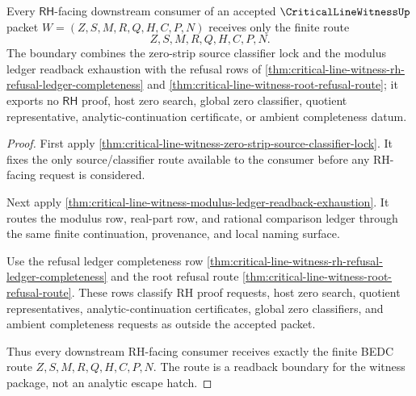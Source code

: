 \begin{theorem}
\label{thm:critical-line-witness-rh-boundary-consumer-nonescape}
Every $\mathsf{RH}$-facing downstream consumer of an accepted $\CriticalLineWitnessUp$ packet $W=(Z,S,M,R,Q,H,C,P,N)$ receives only the finite route
$$
Z,S,M,R,Q,H,C,P,N .
$$
The boundary combines the zero-strip source classifier lock and the modulus ledger readback exhaustion with the refusal rows of \autoref{thm:critical-line-witness-rh-refusal-ledger-completeness} and \autoref{thm:critical-line-witness-root-refusal-route}; it exports no $\mathsf{RH}$ proof, host zero search, global zero classifier, quotient representative, analytic-continuation certificate, or ambient completeness datum.
\end{theorem}
\begin{proof}
First apply \autoref{thm:critical-line-witness-zero-strip-source-classifier-lock}. It fixes the only source/classifier route available to the consumer before any RH-facing request is considered.

Next apply \autoref{thm:critical-line-witness-modulus-ledger-readback-exhaustion}. It routes the modulus row, real-part row, and rational comparison ledger through the same finite continuation, provenance, and local naming surface.

Use the refusal ledger completeness row \autoref{thm:critical-line-witness-rh-refusal-ledger-completeness} and the root refusal route \autoref{thm:critical-line-witness-root-refusal-route}. These rows classify RH proof requests, host zero search, quotient representatives, analytic-continuation certificates, global zero classifiers, and ambient completeness requests as outside the accepted packet.

Thus every downstream RH-facing consumer receives exactly the finite BEDC route $Z,S,M,R,Q,H,C,P,N$. The route is a readback boundary for the witness package, not an analytic escape hatch.
\end{proof}
